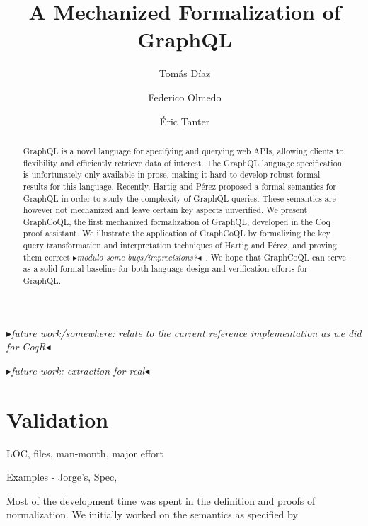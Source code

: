 \documentclass[sigplan,10pt,anonymous,review,nonacm]{acmart}
\newcommand{\mynote}[3]
    {{\color{#3} \fbox{\bfseries\sffamily\scriptsize#1}
    {\small$\blacktriangleright$\textsf{\emph{#2}}$\blacktriangleleft$}}~}
\newcommand{\et}[1]{\mynote{ET}{#1}{purple}}
\begin{document}
\title{A Mechanized Formalization of GraphQL}
\author{Tomás Díaz}

\author{Federico Olmedo}
\author{Éric Tanter}

\begin{abstract}
GraphQL is a novel language for specifying and querying web APIs, allowing clients to flexibility and efficiently retrieve data of interest. The GraphQL language specification is unfortunately only available in prose, making it hard to develop robust formal results for this language. Recently, Hartig and Pérez proposed a formal semantics for GraphQL in order to study the complexity of GraphQL queries. These semantics are however not mechanized and leave certain key aspects unverified. We present GraphCoQL, the first mechanized formalization of GraphQL, developed in the Coq proof assistant. We illustrate the application of GraphCoQL by formalizing the key query transformation and interpretation techniques of Hartig and Pérez, and proving them correct \et{modulo some bugs/imprecisions?}. 
We hope that GraphCoQL can serve as a solid formal baseline for both language design and verification efforts for GraphQL.
\end{abstract}


\maketitle


\et{future work/somewhere: relate to the current reference implementation as we did for CoqR}

\et{future work: extraction for real}







\section{Validation}\label{sec:valid}
LOC, files, man-month, major effort

Examples - Jorge's, Spec,

Most of the development time was spent in the definition and proofs of normalization.
We initially worked on the semantics as specified by \cite{gqlph}







\end{document}
